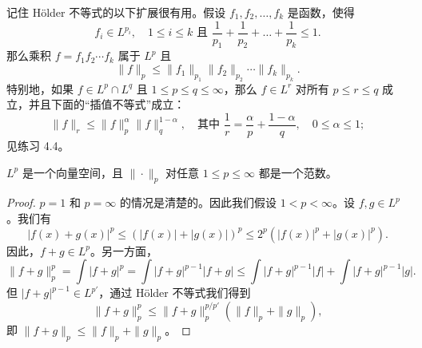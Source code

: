 \begin{remark}
记住 Hölder 不等式的以下扩展很有用。假设 $f_1, f_2, \dots, f_k$ 是函数，使得
\[ f_i \in L^{p_i}, \quad 1 \le i \le k \text{ 且 } \frac{1}{p_1} + \frac{1}{p_2} + \dots + \frac{1}{p_k} \le 1. \]
那么乘积 $f = f_1 f_2 \cdots f_k$ 属于 $L^p$ 且
\[ \|f\|_p \le \|f_1\|_{p_1} \|f_2\|_{p_2} \cdots \|f_k\|_{p_k}. \]
特别地，如果 $f \in L^p \cap L^q$ 且 $1 \le p \le q \le \infty$，那么 $f \in L^r$ 对所有 $p \le r \le q$ 成立，并且下面的“插值不等式”成立：
\[ \|f\|_r \le \|f\|_p^\alpha \|f\|_q^{1-\alpha}, \quad \text{其中 } \frac{1}{r} = \frac{\alpha}{p} + \frac{1-\alpha}{q}, \quad 0 \le \alpha \le 1; \]
见练习 4.4。
\end{remark}

\begin{theorem}\label{theorem4.7}
$L^p$ 是一个向量空间，且 $\| \cdot \|_p$ 对任意 $1 \le p \le \infty$ 都是一个范数。
\end{theorem}
\begin{proof}
$p=1$ 和 $p=\infty$ 的情况是清楚的。因此我们假设 $1 < p < \infty$。设 $f, g \in L^p$。我们有
\[ |f(x)+g(x)|^p \le (|f(x)|+|g(x)|)^p \le 2^p(|f(x)|^p + |g(x)|^p). \]
因此，$f+g \in L^p$。另一方面，
\[ \|f+g\|_p^p = \int |f+g|^p = \int |f+g|^{p-1}|f+g| \le \int |f+g|^{p-1}|f| + \int |f+g|^{p-1}|g|. \]
但 $|f+g|^{p-1} \in L^{p'}$，通过 Hölder 不等式我们得到
\[ \|f+g\|_p^p \le \|f+g\|_p^{p/p'} (\|f\|_p + \|g\|_p), \]
即 $\|f+g\|_p \le \|f\|_p + \|g\|_p$。
\end{proof}

